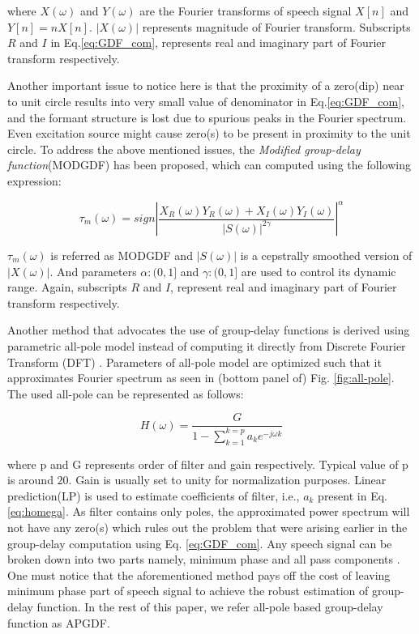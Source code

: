 \documentclass[conference]{IEEEtran}
\begin{document}
where $X(\omega)$ and $Y(\omega)$ are the Fourier transforms of speech signal
$X[n]$ and $Y[n] = nX[n]$. $|X(\omega)|$ represents magnitude of Fourier
transform. Subscripts $R$ and $I$ in Eq.\ref{eq:GDF_com}, represents real and
imaginary part of Fourier transform respectively. 

Another important issue to notice here is that the proximity of a zero(dip) near
to unit circle results into very small value of denominator in
Eq.\ref{eq:GDF_com}, and the formant structure is lost due to spurious peaks in
the Fourier spectrum. Even excitation source might cause zero(s) to be present
in proximity to the unit circle. To address the above mentioned issues, the
\textit{Modified group-delay function}(MODGDF) has been proposed, which can
computed using the following expression:

\begin{equation}
\tau_{m}(\omega) =  sign | \frac{X_R(\omega)Y_R(\omega) + X_I(\omega)Y_I(\omega)}{|S(\omega)|^{2\gamma}} |^{\alpha} 
\label{eq:MODGDF}
\end{equation}

$\tau_{m}(\omega)$  is referred as MODGDF and $|S(\omega)|$ is a cepstrally
smoothed version of $|X(\omega)|$. And parameters $\alpha:(0,1]$ and
$\gamma:(0,1]$ are used to control its dynamic range. Again, subscripts $R$ and
$I$, represent real and imaginary part of Fourier transform respectively. 

Another method that advocates the use of group-delay functions is derived using
parametric all-pole model instead of computing it directly from Discrete Fourier
Transform (DFT) \cite{allPoleGdSid}. Parameters of all-pole model are optimized
such that it approximates Fourier spectrum as seen in (bottom panel of) Fig.
\ref{fig:all-pole}. The used all-pole can be represented as follows: 

\begin{equation}
H(\omega) =  \frac{G}{1 - \sum_{k=1}^{k = p} a_k e^{-j\omega k} }
\label{eq:homega}
\end{equation}

where p and G represents order of filter and gain respectively. Typical value of
p is around $20$. Gain is usually set to unity for normalization purposes.
Linear prediction(LP) is used to estimate coefficients of filter, i.e., $a_k$
present in Eq. \ref{eq:homega}. As filter contains only poles, the approximated
power spectrum will not have any zero(s) which rules out the problem that were
arising earlier in the group-delay computation using Eq. \ref{eq:GDF_com}. Any
speech signal can be broken down into two parts namely, minimum phase and all
pass components \cite{allPoleGdSid}. One must notice that the aforementioned
method pays off the cost of leaving minimum phase part of speech signal to
achieve the robust estimation of group-delay function. In the rest of this
paper, we refer all-pole based group-delay function as APGDF.
\end{document}
